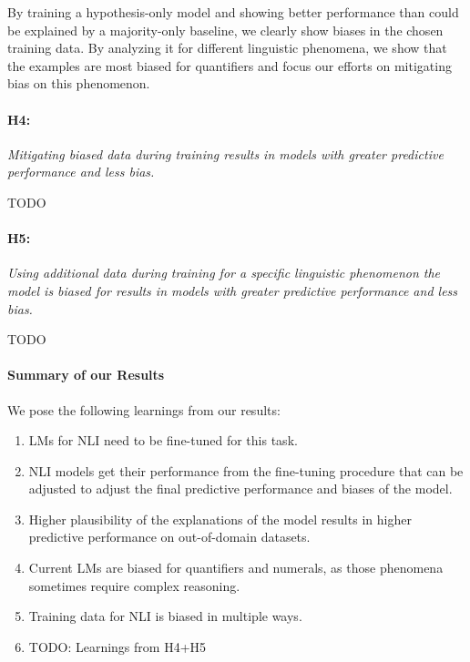 By training a hypothesis-only model and showing better performance than could be explained by a majority-only baseline, we clearly show biases in the chosen training data. By analyzing it for different linguistic phenomena, we show that the examples are most biased for quantifiers and focus our efforts on mitigating bias on this phenomenon. 

\paragraph{H4:} \textit{Mitigating biased data during training results in models with greater predictive performance and less bias.}

TODO

\paragraph{H5:} \textit{Using additional data during training for a specific linguistic phenomenon the model is biased for results in models with greater predictive performance and less bias.}

TODO

\paragraph{Summary of our Results}

We pose the following learnings from our results:

\begin{enumerate}
    \item \acp{LM} for \ac{NLI} need to be fine-tuned for this task.
    \item \ac{NLI} models get their performance from the fine-tuning procedure that can be adjusted to adjust the final predictive performance and biases of the model.
    \item Higher plausibility of the explanations of the model results in higher predictive performance on out-of-domain datasets.
    \item Current \acp{LM} are biased for quantifiers and numerals, as those phenomena sometimes require complex reasoning.
    \item Training data for \ac{NLI} is biased in multiple ways.
    \item TODO: Learnings from H4+H5
\end{enumerate}